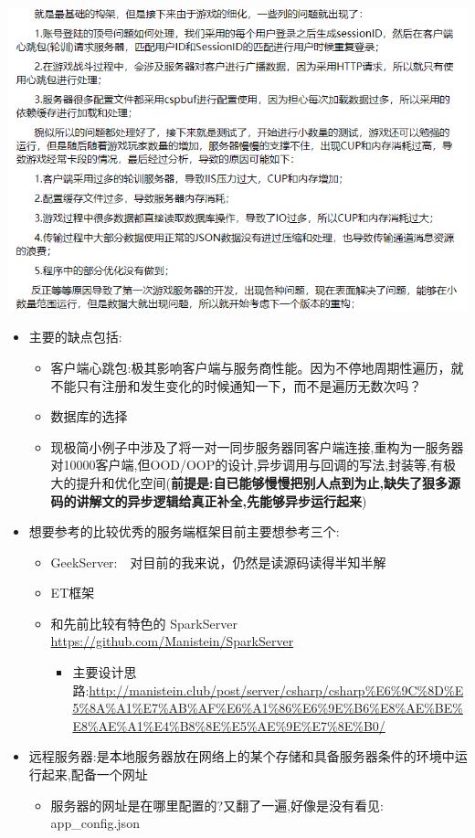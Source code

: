 \documentclass[9pt, b5paper]{article}
\begin{document}
\includegraphics[width=.9\linewidth]{./pic/server_20230103_220110.png}
\begin{itemize}
\item 主要的缺点包括:
\begin{itemize}
\item 客户端心跳包:极其影响客户端与服务商性能。因为不停地周期性遍历，就不能只有注册和发生变化的时候通知一下，而不是遍历无数次吗？
\item 数据库的选择
\item 现极简小例子中涉及了将一对一同步服务器同客户端连接,重构为一服务器对10000客户端,但OOD/OOP的设计,异步调用与回调的写法,封装等,有极大的提升和优化空间(\textbf{前提是:自已能够慢慢把别人点到为止,缺失了狠多源码的讲解文的异步逻辑给真正补全,先能够异步运行起来})
\end{itemize}
\item 想要参考的比较优秀的服务端框架目前主要想参考三个:
\begin{itemize}
\item GeekServer:　对目前的我来说，仍然是读源码读得半知半解
\item ET框架
\item 和先前比较有特色的 SparkServer \url{https://github.com/Manistein/SparkServer}
\begin{itemize}
\item 主要设计思路:\url{http://manistein.club/post/server/csharp/csharp\%E6\%9C\%8D\%E5\%8A\%A1\%E7\%AB\%AF\%E6\%A1\%86\%E6\%9E\%B6\%E8\%AE\%BE\%E8\%AE\%A1\%E4\%B8\%8E\%E5\%AE\%9E\%E7\%8E\%B0/}
\end{itemize}
\end{itemize}
\item 远程服务器:是本地服务器放在网络上的某个存储和具备服务器条件的环境中运行起来,配备一个网址
\begin{itemize}
\item 服务器的网址是在哪里配置的?又翻了一遍,好像是没有看见: app\_config.json

\end{itemize}
\end{itemize}
\end{document}
